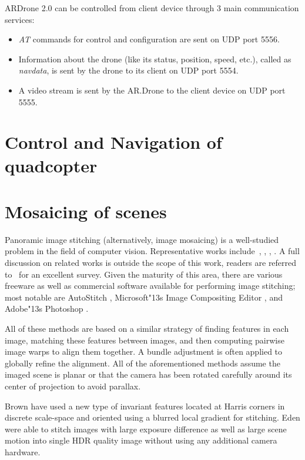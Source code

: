 ARDrone 2.0 can be controlled from client device through 3 main communication
services: 
\begin{itemize}
\item \textit{AT} commands for control and configuration are sent on UDP
port 5556.
\item Information about the drone (like its status, position,  speed, 
etc.), called as \textit{navdata}, is sent by the drone to its client on UDP
port 5554.  
\item A video stream is sent by the AR.Drone to the client device on UDP port
5555.
\end{itemize}

\section{Control and Navigation of quadcopter}

\section{Mosaicing of scenes}
Panoramic image stitching (alternatively, image mosaicing) is a
well-studied problem in the field of computer vision.  Representative
works include~\cite{Milgram1975}, \cite{Milgram1977}, \cite{Capel},
\cite{Szeliski1997} \cite{Brown07} \cite{Brown03}.  A full discussion
on related works is outside the scope of this work, readers are
referred to~\cite{Szeliski05imagealignment} for an excellent survey.
Given the maturity of this area, there are various freeware as well as
commercial software available for performing image stitching; most
notable are AutoStitch \cite{autostitch}, Microsoft\textsc{\char"13}s Image
Compositing Editor \cite{ICE}, and Adobe\textsc{\char"13}s Photoshop
\cite{photoshop}.

All of these methods are based on a similar strategy of finding
features in each image, matching these features between images, and
then computing pairwise image warps to align them together.  A 
bundle adjustment is often applied to globally refine the alignment.
All of the aforementioned methods assume the imaged scene is planar or
that the camera has been rotated carefully around its center of
projection to avoid parallax.

Brown \etal \cite{Brown05} have used a new type of invariant features
located at Harris corners in discrete scale-space and oriented using a
blurred local gradient for stitching. Eden \etal \cite{Eden} were
able to stitch images with large exposure difference as well as large
scene motion into single HDR quality image without using any
additional camera hardware.

